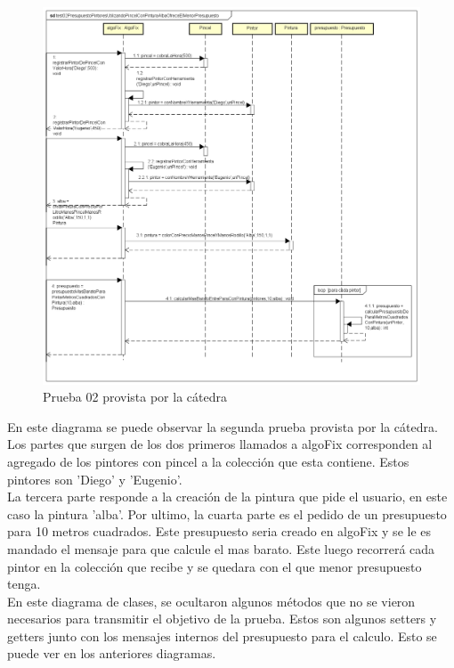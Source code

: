 \documentclass[titlepage,a4paper]{article}
\begin{document}
\begin{figure}[H]
\centering
\includegraphics[width=1\textwidth]{test02PresupuestoPintoresUtilizandoPincelConPinturaAlbaOfreceElMenorPresupuesto.png}
\caption{\label{fig:seq02}Prueba 02 provista por la cátedra}
\end{figure}

En este diagrama se puede observar la segunda prueba provista por la cátedra. Los partes que surgen de los dos primeros llamados a algoFix corresponden al agregado de los pintores con pincel a la colección que esta contiene. Estos pintores son 'Diego' y 'Eugenio'. \\
\indent La tercera parte responde a la creación de la pintura que pide el usuario, en este caso la pintura 'alba'. Por ultimo, la cuarta parte es el pedido de un presupuesto para 10 metros cuadrados.
Este presupuesto seria creado en algoFix y se le es mandado el mensaje para que calcule el mas barato. Este luego recorrerá cada pintor en la colección que recibe y se quedara con el que menor presupuesto tenga.\\
\indent En este diagrama de clases, se ocultaron algunos métodos que no se vieron necesarios para transmitir el objetivo de la prueba. Estos son algunos setters y getters junto con los mensajes internos del presupuesto para el calculo. Esto se puede ver en los anteriores diagramas.
\end{document}
